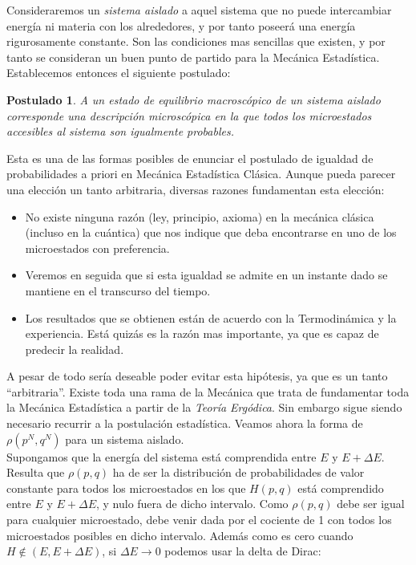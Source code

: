 \documentclass[12pt,a4paper]{article}
\numberwithin{equation}{section}
\numberwithin{figure}{section}
\newtheorem{postulado}{Postulado}
\theoremstyle{definition}
\begin{document}
Consideraremos un \textit{sistema aislado} a aquel sistema que no puede intercambiar energía ni materia con los alrededores, y por tanto poseerá una energía rigurosamente constante. Son las condiciones mas sencillas que existen, y por tanto se consideran un buen punto de partido para la Mecánica Estadística. Establecemos entonces el siguiente postulado:

\begin{postulado}
A un estado de equilibrio macroscópico de un sistema aislado corresponde una descripción microscópica en la que todos los microestados accesibles al sistema son igualmente probables. 
\end{postulado}

Esta es una de las formas posibles de enunciar el postulado de igualdad de probabilidades a priori en Mecánica Estadística Clásica. Aunque pueda parecer una elección un tanto arbitraria, diversas razones fundamentan esta elección:

\begin{itemize}
\item No existe ninguna razón (ley, principio, axioma) en la mecánica clásica (incluso en la cuántica) que nos indique que deba encontrarse en uno de los microestados con preferencia. \\
\item Veremos en seguida que si esta igualdad se admite en un instante dado se mantiene en el transcurso del tiempo. \\
\item Los resultados que se obtienen están de acuerdo con la Termodinámica y la experiencia. Está quizás es la razón mas importante, ya que es capaz de predecir la realidad. 
\end{itemize}

A pesar de todo sería deseable poder evitar esta hipótesis, ya que es un tanto ``arbitraria''. Existe toda una rama de la Mecánica que trata de fundamentar toda la Mecánica Estadística a partir de la \textit{Teoría Ergódica}. Sin embargo sigue siendo necesario recurrir a la postulación estadística. Veamos ahora la forma de $\rho (p^N,q^N)$ para un sistema aislado. \\

Supongamos que la energía del sistema está comprendida entre $E$ y $E+\Delta E$. Resulta que $\rho (p,q)$ ha de ser la distribución de probabilidades de valor constante para todos los microestados en los que $H(p,q)$ está comprendido entre $E$ y $E+\Delta E$, y nulo fuera de dicho intervalo. Como $\rho(p,q)$ debe ser igual para cualquier microestado, debe venir dada por el cociente de 1 con todos los microestados posibles en dicho intervalo. Además como es cero cuando $H \notin (E,E+\Delta E)$, si $\Delta E \rightarrow 0$ podemos usar la delta de Dirac:
\end{document}
